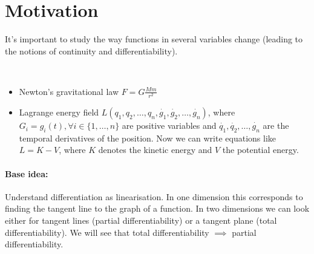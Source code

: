 \section{Motivation}
It's important to study the way functions in several variables change (leading to the notions of continuity and differentiability). 
\begin{exam}\ 
 \begin{itemize}
  \item Newton's gravitational law $F=G\frac{Mm}{r^2}$
  \item Lagrange energy field $L(q_1, q_2,\ldots, q_n, \dot{g_1}, \dot{g_2}, \ldots, \dot{g_n})$, where $G_i=g_i(t), \forall i\in\{1, \ldots, n\}$ are positive variables and $\dot{q_1}, \dot{q_2}, \ldots, \dot{g_n}$ are the temporal derivatives of the position. Now we can write equations like $L=K-V$, where $K$ denotes the kinetic energy and $V$ the potential energy. 
 \end{itemize}
\end{exam}
\paragraph{Base idea:}
Understand differentiation as linearisation. In one dimension this corresponds to finding the tangent line to the graph of a function. In two dimensions we can look either for tangent lines (partial differentiability) or a tangent plane (total differentiability). We will see that total differentiability $\implies$ partial differentiability.
